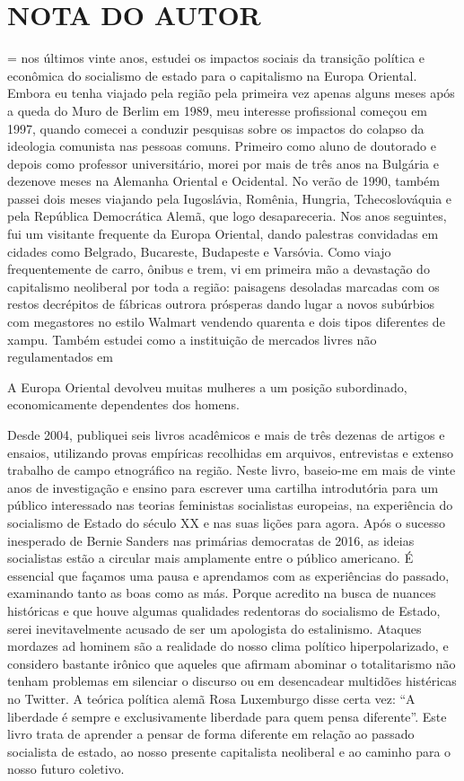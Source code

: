 \chapter{NOTA DO AUTOR}\label{NOTA DO AUTOR}
 \par 
= nos últimos vinte anos, estudei os impactos sociais da transição política e econômica do socialismo de estado para o capitalismo na Europa Oriental. Embora eu tenha viajado pela região pela primeira vez apenas alguns meses após a queda do Muro de Berlim em 1989, meu interesse profissional começou em 1997, quando comecei a conduzir pesquisas sobre os impactos do colapso da ideologia comunista nas pessoas comuns. Primeiro como aluno de doutorado e depois como professor universitário, morei por mais de três anos na Bulgária e dezenove meses na Alemanha Oriental e Ocidental. No verão de 1990, também passei dois meses viajando pela Iugoslávia, Romênia, Hungria, Tchecoslováquia e pela República Democrática Alemã, que logo desapareceria. Nos anos seguintes, fui um visitante frequente da Europa Oriental, dando palestras convidadas em cidades como Belgrado, Bucareste, Budapeste e Varsóvia. Como viajo frequentemente de carro, ônibus e trem, vi em primeira mão a devastação do capitalismo neoliberal por toda a região: paisagens desoladas marcadas com os restos decrépitos de fábricas outrora prósperas dando lugar a novos subúrbios com megastores no estilo Walmart vendendo quarenta e dois tipos diferentes de xampu. Também estudei como a instituição de mercados livres não regulamentados em
 \par 
A Europa Oriental devolveu muitas mulheres a um posição subordinado, economicamente dependentes dos homens.
 \par 
Desde 2004, publiquei seis livros acadêmicos e mais de três dezenas de artigos e ensaios, utilizando provas empíricas recolhidas em arquivos, entrevistas e extenso trabalho de campo etnográfico na região. Neste livro, baseio-me em mais de vinte anos de investigação e ensino para escrever uma cartilha introdutória para um público interessado nas teorias feministas socialistas europeias, na experiência do socialismo de Estado do século XX e nas suas lições para agora. Após o sucesso inesperado de Bernie Sanders nas primárias democratas de 2016, as ideias socialistas estão a circular mais amplamente entre o público americano. É essencial que façamos uma pausa e aprendamos com as experiências do passado, examinando tanto as boas como as más. Porque acredito na busca de nuances históricas e que houve algumas qualidades redentoras do socialismo de Estado, serei inevitavelmente acusado de ser um apologista do estalinismo. Ataques mordazes ad hominem são a realidade do nosso clima político hiperpolarizado, e considero bastante irônico que aqueles que afirmam abominar o totalitarismo não tenham problemas em silenciar o discurso ou em desencadear multidões histéricas no Twitter. A teórica política alemã Rosa Luxemburgo disse certa vez: “A liberdade é sempre e exclusivamente liberdade para quem pensa diferente”. Este livro trata de aprender a pensar de forma diferente em relação ao passado socialista de estado, ao nosso presente capitalista neoliberal e ao caminho para o nosso futuro coletivo.
